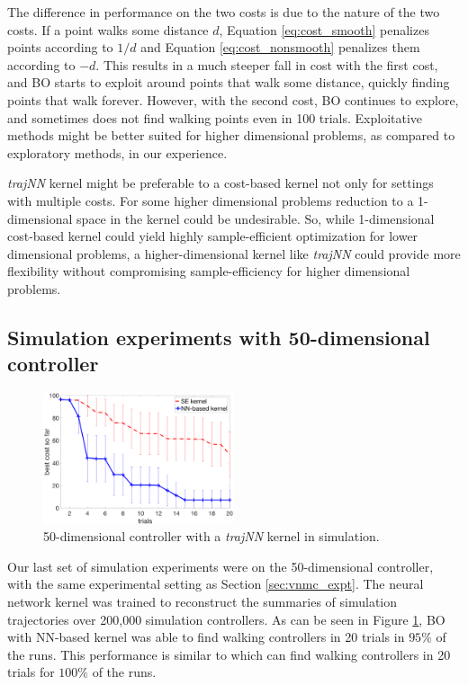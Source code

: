The difference in performance on the two costs is due to the nature of the two costs. If a point walks some distance $d$, Equation \ref{eq:cost_smooth} penalizes points according to $1/d$ and Equation \ref{eq:cost_nonsmooth} penalizes them according to $-d$. This results in a much steeper fall in cost with the first cost, and BO starts to exploit around points that walk some distance, quickly finding points that walk forever. However, with the second cost, BO continues to explore, and sometimes does not find walking points even in 100 trials. Exploitative methods might be better suited for higher dimensional problems, as compared to exploratory methods, in our experience. 

\textit{trajNN} kernel might be preferable to a cost-based kernel not only for settings with multiple costs. For some higher dimensional problems reduction to a 1-dimensional space in the kernel could be undesirable. So, while 1-dimensional cost-based kernel could yield highly sample-efficient optimization for lower dimensional problems, a higher-dimensional kernel like \textit{trajNN} could provide more flexibility without compromising sample-efficiency for higher dimensional problems.

\subsection{Simulation experiments with 50-dimensional controller}

\begin{figure}
    \centering
    \includegraphics[width = 0.5\textwidth]{img/NN4_20runs_250K_holdout.png}
    \caption{50-dimensional controller with a \textit{trajNN} kernel in simulation.}
    \label{fig:nn4_vnmc}
\end{figure}

Our last set of simulation experiments were on the 50-dimensional controller, with the same experimental setting as Section \ref{sec:vnmc_expt}. The neural network kernel was trained to reconstruct the summaries of simulation trajectories over 200,000 simulation controllers. As can be seen in Figure \ref{fig:nn4_vnmc}, BO with NN-based kernel was able to find walking controllers in 20 trials in $95\%$ of the runs. This performance is similar to \dogkernel which can find walking controllers in 20 trials for $100\%$ of the runs. 

